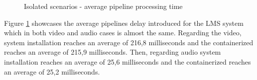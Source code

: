 \begin{figure}[!htb]
\begin{center}
\begin{subfigmatrix}{2}
    \end{subfigmatrix}
    \caption{Isolated scenarios - average pipeline processing time}
    \label{F:isoappt}
  \end{center}
\end{figure}

Figure \ref{F:isoappt} showcases the average pipelines delay introduced for the LMS system which in both video and audio cases is almost the same. Regarding the video, system installation reaches an average of 216,8 milliseconds and the containerized reaches an average of 215,9 milliseconds. Then, regarding audio system installation reaches an average of 25,6 milliseconds and the containerized reaches an average of 25,2 milliseconds.

